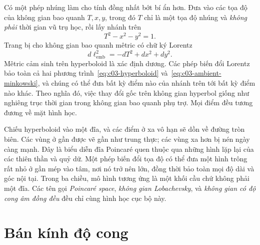 Có một phép nhúng làm cho tính đồng nhất bớt bí ẩn hơn. Đưa vào các tọa độ của không gian bao quanh \(T,x,y\), trong đó \(T\) chỉ là một tọa độ nhúng và \emph{không phải} thời gian vũ trụ học, rồi lấy nhánh trên
\begin{equation}
T^2 - x^2 - y^2 = 1.
\label{eq:c03-hyperboloid}
\end{equation}
Trang bị cho không gian bao quanh mêtric có chữ ký Lorentz
\begin{equation}
d\ell_{\mathrm{emb}}^2=-dT^2+dx^2+dy^2.
\label{eq:c03-ambient-minkowski}
\end{equation}
Mêtric cảm sinh trên hyperboloid là xác định dương. Các phép biến đổi Lorentz bảo toàn cả hai phương trình~\eqref{eq:c03-hyperboloid} và~\eqref{eq:c03-ambient-minkowski}, và chúng có thể đưa bất kỳ điểm nào của nhánh trên tới bất kỳ điểm nào khác. Theo nghĩa đó, việc thay đổi gốc trên không gian hyperbol giống như nghiêng trục thời gian trong không gian bao quanh phụ trợ. Mọi điểm đều tương đương về mặt hình học.

Chiếu hyperboloid vào một đĩa, và các điểm ở xa vô hạn sẽ dồn về đường tròn biên. Các vùng ở gần được vẽ gần như trung thực; các vùng xa hơn bị nén ngày càng mạnh. Đây là biểu diễn đĩa Poincar\'e quen thuộc qua những hình lặp lại của các thiên thần và quỷ dữ. Một phép biến đổi tọa độ có thể đưa một hình trông rất nhỏ ở gần mép vào tâm, nơi nó trở nên lớn, đồng thời bảo toàn mọi độ dài và góc nội tại. Trong ba chiều, mô hình tương ứng là một khối cầu chứ không phải một đĩa. Các tên gọi \emph{Poincar\'e space}, \emph{không gian Lobachevsky}, và \emph{không gian có độ cong âm đồng đều} đều chỉ cùng hình học cục bộ này.

\begin{classroomqa}
\end{classroomqa}

\section{Bán kính độ cong}

